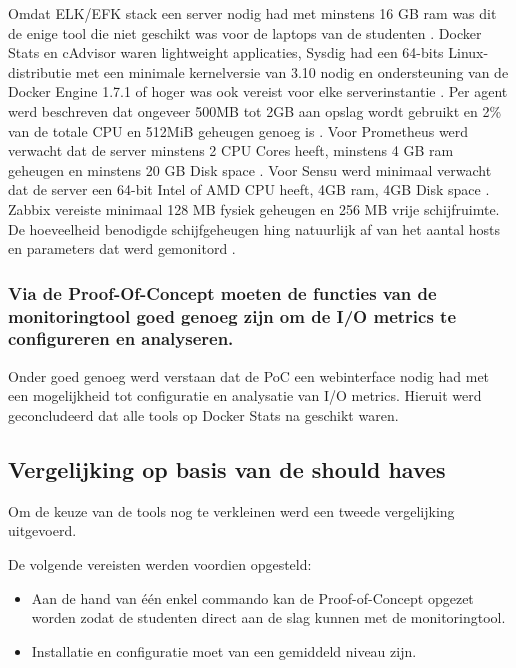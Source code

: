 Omdat ELK/EFK stack een server nodig had met minstens 16 GB ram was dit de enige tool die niet geschikt was voor de laptops van de studenten \autocite{Elastic}. Docker Stats en cAdvisor waren lightweight applicaties, Sysdig had een 64-bits Linux-distributie met een minimale kernelversie van 3.10 nodig en ondersteuning van de Docker Engine 1.7.1 of hoger was ook vereist voor elke serverinstantie \autocite{SysdigB2020}. Per agent werd beschreven dat ongeveer 500MB tot 2GB aan opslag wordt gebruikt en 2\% van de totale CPU en 512MiB geheugen genoeg is \autocite{SysdigA2020}. Voor Prometheus werd verwacht dat de server minstens 2 CPU Cores heeft, minstens 4 GB ram geheugen en minstens 20 GB Disk space \autocite{oreilly}. Voor Sensu werd minimaal verwacht dat de server een 64-bit Intel of AMD CPU heeft, 4GB ram, 4GB Disk space \autocite{Sensu}. Zabbix vereiste minimaal 128 MB fysiek geheugen en 256 MB vrije schijfruimte. De hoeveelheid benodigde schijfgeheugen hing natuurlijk af van het aantal hosts en parameters dat werd gemonitord \autocite{ZabbixB}. 

\subsubsection{Via de Proof-Of-Concept moeten de functies van de monitoringtool goed genoeg zijn om de I/O metrics te configureren en analyseren.}

Onder goed genoeg werd verstaan dat de PoC een webinterface nodig had met een mogelijkheid tot configuratie en analysatie van I/O metrics. Hieruit werd geconcludeerd dat alle tools op Docker Stats na geschikt waren.

\subsection{Vergelijking op basis van de should haves}

Om de keuze van de tools nog te verkleinen werd een tweede vergelijking uitgevoerd.

De volgende vereisten werden voordien opgesteld:

\begin{itemize}
    \item Aan de hand van één enkel commando kan de Proof-of-Concept opgezet worden zodat de studenten direct aan de slag kunnen met de monitoringtool.
    \item Installatie en configuratie moet van een gemiddeld niveau zijn.
\end{itemize}


